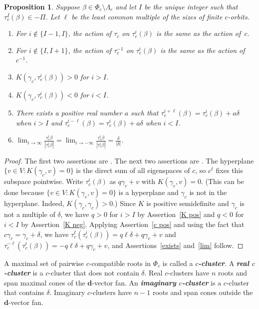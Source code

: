 \documentclass{amsart}
\newtheorem{proposition}{Proposition}[section]
\theoremstyle{definition}
\theoremstyle{remark}
\numberwithin{equation}{section}
\newcommand{\newword}[1]{\textbf{\emph{#1}}}
\newcommand{\set}[1]{{\lbrace #1 \rbrace}}
\newcommand{\0}{{\mathbf{0}}}
\newcommand{\dd}{{\mathbf d}}
\newcommand{\RSChar}{\Phi}
\newcommand{\RS}{\RSChar}
\newcommand{\SimplesChar}{\Pi}
\newcommand{\Simples}{\SimplesChar}
\newcommand{\AP}[1]{\RS_{#1}}
\newcommand{\APTChar}{\Lambda}
\newcommand{\APT}[1]{\APTChar_{#1}}
\begin{document}
\begin{proposition}\label{delta limit}
Suppose $\beta\in\AP{c}\setminus\APT{c}$ and let $I$ be the unique integer such that $\tau_c^I(\beta)\in-\Simples$.
Let $\ell$ be the least common multiple of the sizes of finite $c$-orbits.
\begin{enumerate}[label=\bf\arabic*., ref=\arabic*]
\item \label{c pos}
For $i\not\in\set{I-1,I}$, the action of $\tau_c$ on $\tau_c^i(\beta)$ is the same as the action of~$c$.
\item \label{c neg}
For $i\not\in\set{I,I+1}$, the action of $\tau_c^{-1}$ on $\tau_c^i(\beta)$ is the same as the action of~$c^{-1}$.
\item \label{K pos}
$K(\gamma_c,\tau_c^i(\beta))>0$ for $i>I$.
\item \label{K neg}
$K(\gamma_c,\tau_c^i(\beta))<0$ for $i<I$.
\item \label{exists}
There exists a positive real number $a$ such that $\tau_c^{i+\ell}(\beta)=\tau_c^i(\beta)+a\delta$ when $i>I$ and $\tau_c^{i-\ell}(\beta)=\tau_c^i(\beta)+a\delta$ when $i<I$.
\item \label{lim}
$\displaystyle\lim_{i\to\infty}\frac{\tau_c^i\beta}{|\tau_c^i\beta|}=\lim_{i\to-\infty}\frac{\tau_c^i\beta}{|\tau_c^i\beta|}=\frac{\delta}{|\delta|}$.
\end{enumerate}
\end{proposition}

\begin{proof}
The first two assertions are \cite[Proposition~3.12(2)]{affdenom}.
The next two assertions are \cite[Proposition~3.12(8)]{affdenom}.
The hyperplane $\set{v\in V:K(\gamma_c,v)=0}$ is the direct sum of all eigenspaces of $c$, so $c^\ell$ fixes this subspace pointwise.
Write $\tau_c^i(\beta)$ as $q\gamma_c+v$ with $K(\gamma_c,v)=0$. 
(This can be done because $\set{v\in V:K(\gamma_c,v)=0}$ is a hyperplane and $\gamma_c$ is not in the hyperplane.  
Indeed, $K(\gamma_c,\gamma_c)>0$.)
Since $K$ is positive semidefinite and $\gamma_c$ is not a multiple of $\delta$, we have $q>0$ for $i>I$ by Assertion~\ref{K pos} and $q<0$ for $i<I$ by Assertion~\ref{K neg}.
Applying Assertion~\ref{c pos} and using the fact that $c\gamma_c=\gamma_c+\delta$, we have $\tau_c^\ell(\tau_c^i(\beta))=q\ell\delta+q\gamma_c+v$ and $\tau_c^{-\ell}(\tau_c^i(\beta))=-q\ell\delta+q\gamma_c+v$, and Assertions~\ref{exists} and~\ref{lim} follow.
\end{proof}

A maximal set of pairwise $c$-compatible roots in $\AP{c}$ is called a \newword{$c$-cluster}.
A \newword{real $c$-cluster} is a $c$-cluster that does not contain $\delta$.
Real $c$-clusters have $n$ roots and span maximal cones of the $\dd$-vector fan.
An \newword{imaginary $c$-cluster} is a $c$-cluster that contains $\delta$.
Imaginary $c$-clusters have $n-1$ roots and span cones outside the $\dd$-vector fan.
\end{document}

